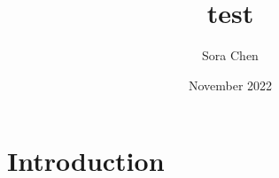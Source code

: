 \documentclass{article}
\title{test}
\author{Sora Chen}
\date{November 2022}
\begin{document}
\maketitle

\section{Introduction}
\end{document}
